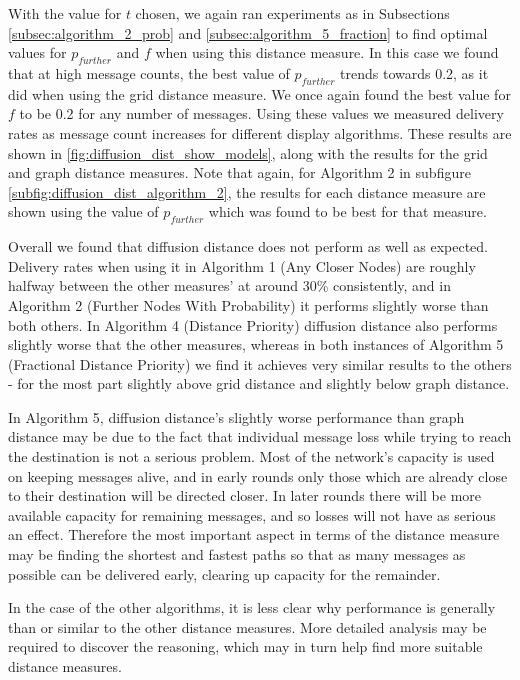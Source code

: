 \documentclass[bsc,frontabs,twoside,singlespacing,parskip,deptreport]{infthesis}     %
\begin{document}
With the value for $t$ chosen, we again ran experiments as in Subsections \ref{subsec:algorithm_2_prob} and \ref{subsec:algorithm_5_fraction} to find optimal values for $p_{further}$ and $f$ when using this distance measure. In this case we found that at high message counts, the best value of $p_{further}$ trends towards 0.2, as it did when using the grid distance measure. We once again found the best value for $f$ to be 0.2 for any number of messages. Using these values we measured delivery rates as message count increases for different display algorithms. These results are shown in \ref{fig:diffusion_dist_show_models}, along with the results for the grid and graph distance measures. Note that again, for Algorithm 2 in subfigure \ref{subfig:diffusion_dist_algorithm_2}, the results for each distance measure are shown using the value of $p_{further}$ which was found to be best for that measure.

Overall we found that diffusion distance does not perform as well as expected. Delivery rates when using it in Algorithm 1 (Any Closer Nodes) are roughly halfway between the other measures' at around 30\% consistently, and in Algorithm 2 (Further Nodes With Probability) it performs slightly worse than both others. In Algorithm 4 (Distance Priority) diffusion distance also performs slightly worse that the other measures, whereas in both instances of Algorithm 5 (Fractional Distance Priority) we find it achieves very similar results to the others - for the most part slightly above grid distance and slightly below graph distance.

In Algorithm 5, diffusion distance's slightly worse performance than graph distance may be due to the fact that individual message loss while trying to reach the destination is not a serious problem. Most of the network's capacity is used on keeping messages alive, and in early rounds only those which are already close to their destination will be directed closer. In later rounds there will be more available capacity for remaining messages, and so losses will not have as serious an effect. Therefore the most important aspect in terms of the distance measure may be finding the shortest and fastest paths so that as many messages as possible can be delivered early, clearing up capacity for the remainder.

In the case of the other algorithms, it is less clear why performance is generally than or similar to the other distance measures. More detailed analysis may be required to discover the reasoning, which may in turn help find more suitable distance measures.
\end{document}
